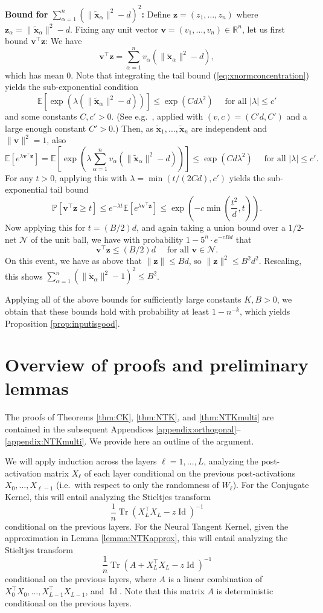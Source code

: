\documentclass{article}
\theoremstyle{definition}
\newcommand{\R}{\mathbb{R}}
\newcommand{\N}{\mathcal{N}}
\newcommand{\E}{\mathbb{E}}
\newcommand{\Id}{\operatorname{Id}}
\newcommand{\Tr}{\operatorname{Tr}}
\newcommand{\z}{\mathbf{z}}
\renewcommand{\v}{\mathbf{v}}
\renewcommand{\a}{\alpha}
\renewcommand{\P}{\mathbb{P}}
\newcommand{\wx}{\tilde{\mathbf{x}}}
\newcommand{\1}{\mathbf{1}}
\begin{document}
{\bf Bound for $\sum_{\a=1}^n (\|\wx_\a\|^2-d)^2$:}
Define $\z=(z_1,\ldots,z_n)$ where $\z_\a=\|\wx_\a\|^2-d$.
Fixing any unit vector $\v=(v_1,\ldots,v_n) \in \R^n$, let us first bound
$\v^\top \z$: We have
\[\v^\top \z=\sum_{\a=1}^n v_\a (\|\wx_\a\|^2-d),\]
which has mean 0. Note that integrating the tail bound
(\ref{eq:xnormconcentration}) yields the sub-exponential condition
\[\E\left[\exp\left(\lambda(\|\wx_\a\|^2-d)\right)\right] 
\leq \exp(Cd\lambda^2)
\quad \text{ for all } |\lambda| \leq c'\]
and some constants $C,c'>0$. (See e.g.\ \cite[Theorem
2.3]{boucheron2013concentration}, applied with $(v,c)=(C'd,C')$ and a large enough constant $C'>0$.)
Then, as $\wx_1,\ldots,\wx_n$ are independent and $\|\v\|^2=1$, also
\[\E[e^{\lambda \v^\top \z}]
=\E\left[\exp\left(\lambda \sum_{\a=1}^n v_\a(\|\wx_\a\|^2-d)\right)\right] 
\leq \exp(Cd\lambda^2)
\quad \text{ for all } |\lambda| \leq c'.\]
For any $t>0$, applying this with $\lambda=\min(t/(2Cd),c')$
yields the sub-exponential tail bound
\[\P[\v^\top \z \geq t] \leq e^{-\lambda t}\E[e^{\lambda \v^\top \z}]
\leq \exp\left(-c\min\left(\frac{t^2}{d},t\right)\right).\]
Now applying this for $t=(B/2)d$, and again
taking a union bound over a $1/2$-net $\N$ of the unit ball, we have with
probability $1-5^n \cdot e^{-cBd}$ that
\[\v^\top \z \leq (B/2)d \quad \text{ for all } \v \in \N.\]
On this event, we have as above that $\|\z\| \leq Bd$, so $\|\z\|^2 \leq
B^2d^2$. Rescaling, this shows $\sum_{\a=1}^n (\|\wx_\a\|^2-1)^2 \leq B^2$.

Applying all of the above bounds for sufficiently large constants $K,B>0$, we
obtain that these bounds hold with probability at least $1-n^{-k}$, which yields
Proposition \ref{prop:inputisgood}.

\section{Overview of proofs and preliminary lemmas}\label{appendix:overview}

The proofs of Theorems \ref{thm:CK}, \ref{thm:NTK}, and \ref{thm:NTKmulti} are
contained in the subsequent Appendices
\ref{appendix:orthogonal}--\ref{appendix:NTKmulti}. We provide here an outline
of the argument.

We will apply induction across the layers $\ell=1,\ldots,L$,
analyzing the post-activation matrix $X_\ell$ of each layer conditional on the
previous post-activations $X_0,\ldots,X_{\ell-1}$ (i.e.\ with respect to only
the randomness of $W_\ell$). For the Conjugate Kernel, this will entail
analyzing the Stieltjes transform
\[\frac{1}{n} \Tr (X_L^\top X_L-z\Id)^{-1}\]
conditional on the previous layers. For the Neural Tangent Kernel, given the
approximation in Lemma \ref{lemma:NTKapprox}, this will entail analyzing
the Stieltjes transform
\[\frac{1}{n} \Tr (A+X_L^\top X_L-z\Id)^{-1}\]
conditional on the previous layers, where $A$ is a linear combination of
$X_0^\top X_0,\ldots,X_{L-1}^\top X_{L-1}$, and $\Id$. Note that this matrix $A$
is deterministic conditional on the previous layers.
\end{document}
